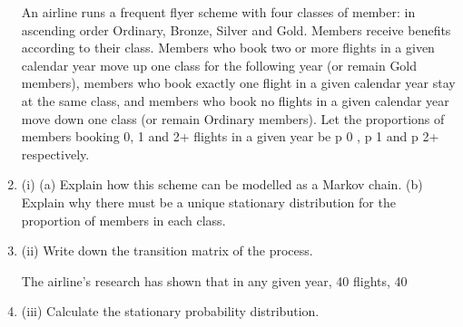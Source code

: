 \documentclass[a4paper,12pt]{article}
\begin{document}
\begin{enumerate}

An airline runs a frequent flyer scheme with four classes of member: in ascending order Ordinary, Bronze, Silver and Gold. Members receive benefits according to their
class. Members who book two or more flights in a given calendar year move up one  class for the following year (or remain Gold members), members who book exactly
one flight in a given calendar year stay at the same class, and members who book no
flights in a given calendar year move down one class (or remain Ordinary members).
Let the proportions of members booking 0, 1 and 2+ flights in a given year be p 0 , p 1
and p 2+ respectively.
\item (i)
(a) Explain how this scheme can be modelled as a Markov chain.
(b) Explain why there must be a unique stationary distribution for the
proportion of members in each class.
 
\item (ii)
Write down the transition matrix of the process.
 
The airline’s research has shown that in any given year, 40%
flights, 40%
\item (iii)
Calculate the stationary probability distribution.
 

\end{enumerate}
\end{document}
